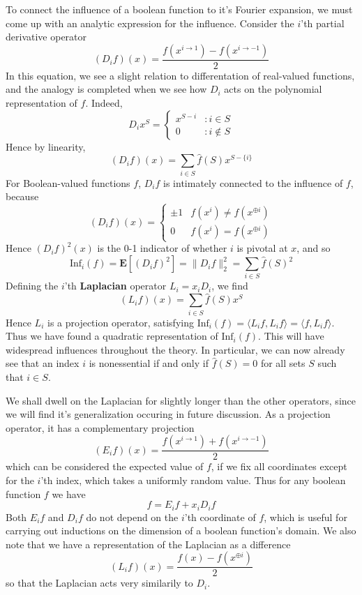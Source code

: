 To connect the influence of a boolean function to it's Fourier expansion, we must come up with an analytic expression for the influence. Consider the $i$'th partial derivative operator
%
\[ (D_if)(x) = \frac{f(x^{i \to 1}) - f(x^{i \to -1})}{2} \]
%
In this equation, we see a slight relation to differentation of real-valued functions, and the analogy is completed when we see how $D_i$ acts on the polynomial representation of $f$. Indeed,
%
\[ D_ix^S = \begin{cases} x^{S - i} & : i \in S \\ 0 & : i \not \in S \end{cases} \]
%
Hence by linearity,
%
\[ (D_if)(x) = \sum_{i \in S} \widehat{f}(S) x^{S - \{ i \}} \]
%
For Boolean-valued functions $f$, $D_if$ is intimately connected to the influence of $f$, because
%
\[ (D_if)(x) = \begin{cases} \pm 1 & f(x^i) \neq f(x^{\oplus i}) \\ 0 & f(x^i) = f(x^{\oplus i}) \end{cases} \]
%
Hence $(D_if)^2(x)$ is the 0-1 indicator of whether $i$ is pivotal at $x$, and so
%
\[ \text{Inf}_i(f) = \mathbf{E}[(D_if)^2] = \| D_if \|_2^2 = \sum_{i \in S} \widehat{f}(S)^2 \]
%
Defining the $i$'th {\bf Laplacian} operator $L_i = x_i D_i$, we find
%
\[ (L_i f)(x) = \sum_{i \in S} \widehat{f}(S) x^S \]
%
Hence $L_i$ is a projection operator, satisfying $\text{Inf}_i(f) = \langle L_i f, L_i f \rangle = \langle f, L_i f \rangle$. Thus we have found a quadratic representation of $\text{Inf}_i(f)$. This will have widespread influences throughout the theory. In particular, we can now already see that an index $i$ is nonessential if and only if $\widehat{f}(S) = 0$ for all sets $S$ such that $i \in S$.

We shall dwell on the Laplacian for slightly longer than the other operators, since we will find it's generalization occuring in future discussion. As a projection operator, it has a complementary projection
%
\[ (E_i f)(x) = \frac{f(x^{i \to 1}) + f(x^{i \to -1})}{2} \]
%
which can be considered the expected value of $f$, if we fix all coordinates except for the $i$'th index, which takes a uniformly random value. Thus for any boolean function $f$ we have
%
\[ f = E_i f + x_i D_i f \]
%
Both $E_i f$ and $D_i f$ do not depend on the $i$'th coordinate of $f$, which is useful for carrying out inductions on the dimension of a boolean function's domain. We also note that we have a representation of the Laplacian as a difference
%
\[ (L_i f)(x) = \frac{f(x) - f(x^{\oplus i})}{2} \]
%
so that the Laplacian acts very similarily to $D_i$.

